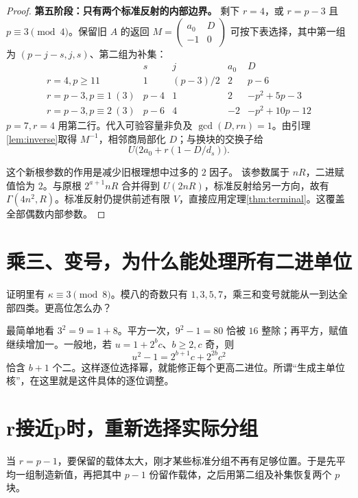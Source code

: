 \documentclass[11pt,a4paper,oneside,openany]{book}
\theoremstyle{definition}
\numberwithin{equation}{chapter}
\begin{document}
\begin{proof}
\par\noindent\textbf{第五阶段：只有两个标准反射的内部边界。}
剩下 $r=4$，或 $r=p-3$ 且 $p\equiv3\pmod4$。保留旧 $A$ 的返回 $M=\left(\begin{smallmatrix}a_0&D\\-1&0\end{smallmatrix}\right)$ 可按下表选择，其中第一组为 $(p-j-s,j,s)$、第二组为补集：
\[
\begin{array}{c|rrrr}
&s&j&a_0&D\\\hline
r=4,p\ge11&1&(p-3)/2&2&p-6\\
r=p-3,p\equiv1\ (3)&p-4&1&2&-p^2+5p-3\\
r=p-3,p\equiv2\ (3)&p-6&4&-2&-p^2+10p-12
\end{array}
\]
$p=7,r=4$ 用第二行。代入可验容量非负及 $\gcd(D,rn)=1$。由引理\ref{lem:inverse}取得 $M^{-1}$，相邻商局部化 $D$；与换块的交换子给
\[U\bigl(2a_0+r(1-D/d_s)\bigr).
\]

这个新根参数的作用是减少旧根理想中过多的 $2$ 因子。
该参数属于 $nR$，二进赋值恰为 $2$。与原根 $2^{a+1}nR$ 合并得到 $U(2nR)$，标准反射给另一方向，故有 $\Gamma(4n^2,R)$。标准反射仍提供前述有限 $V$，直接应用定理\ref{thm:terminal}。这覆盖全部偶数内部参数。
\end{proof}

\section{乘三、变号，为什么能处理所有二进单位}
证明里有 $\kappa\equiv3\pmod8$。模八的奇数只有 $1,3,5,7$，乘三和变号就能从一到达全部四类。更高位怎么办？

最简单地看 $3^2=9=1+8$。平方一次，$9^2-1=80$ 恰被 $16$ 整除；再平方，赋值继续增加一。一般地，若 $u=1+2^bc$、$b\ge2,c$ 奇，则
\[u^2-1=2^{b+1}c+2^{2b}c^2
\]
恰含 $b+1$ 个二。这样逐位选择幂，就能修正每个更高二进位。所谓“生成主单位核”，在这里就是这件具体的逐位调整。

\section{r接近p时，重新选择实际分组}
当 $r=p-1$，要保留的载体太大，刚才某些标准分组不再有足够位置。于是先平均一组制造新值，再把其中 $p-1$ 份留作载体，之后用第二组及补集恢复两个 $p$ 块。
\end{document}
